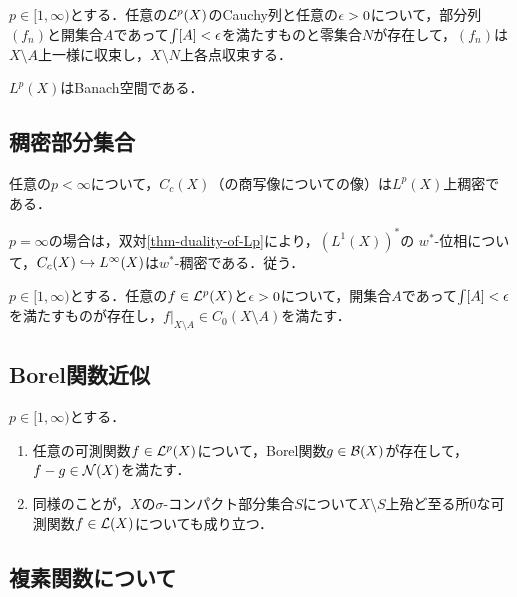 \documentclass[uplatex,dvipdfmx]{jsreport}
\begin{document}
\begin{proposition}
    $p\in[1,\infty)$とする．任意の$\mathcal{L}^p(X)$のCauchy列と任意の$\epsilon>0$について，部分列$(f_n)$と開集合$A$であって$\int[A]<\epsilon$を満たすものと零集合$N$が存在して，$(f_n)$は$X\setminus A$上一様に収束し，$X\setminus N$上各点収束する．
\end{proposition}

\begin{theorem}\label{thm-Riesz-Fischer}
    $L^p(X)$はBanach空間である．
\end{theorem}

\subsection{稠密部分集合}

\begin{proposition}\label{prop-dense-subset-of-Lp}
    任意の$p<\infty$について，$C_c(X)$（の商写像についての像）は$L^p(X)$上稠密である．
\end{proposition}
\begin{remarks}
    $p=\infty$の場合は，双対\ref{thm-duality-of-Lp}により，$(L^1(X))^*$の
    $w^*$-位相について，$C_c(X)\hookrightarrow L^\infty(X)$は$w^*$-稠密である．従う．
\end{remarks}

\begin{corollary}
    $p\in[1,\infty)$とする．任意の$f\in\mathcal{L}^p(X)$と$\epsilon>0$について，開集合$A$であって$\int[A]<\epsilon$を満たすものが存在し，$f|_{X\setminus A}\in C_0(X\setminus A)$を満たす．
\end{corollary}

\subsection{Borel関数近似}

\begin{proposition}
    $p\in[1,\infty)$とする．
    \begin{enumerate}
        \item 任意の可測関数$f\in\mathcal{L}^p(X)$について，Borel関数$g\in\mathcal{B}(X)$が存在して，$f-g\in\mathcal{N}(X)$を満たす．
        \item 同様のことが，$X$の$\sigma$-コンパクト部分集合$S$について$X\setminus S$上殆ど至る所$0$な可測関数$f\in\mathcal{L}(X)$についても成り立つ．
    \end{enumerate}
\end{proposition}

\subsection{複素関数について}
\end{document}
